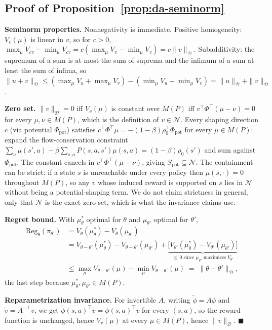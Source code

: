 \documentclass{article}
\newcommand{\Dnorm}[1]{\|#1\|_{\mathcal D}}
\begin{document}
\subsection{Proof of Proposition~\ref{prop:da-seminorm}}
\label{app:proof-da-seminorm}

\textbf{Seminorm properties.} Nonnegativity is immediate. Positive homogeneity:
$V_v(\mu)$ is linear in $v$, so for $c>0$, $\max_\mu V_{cv}-\min_\mu
V_{cv}=c(\max_\mu V_v-\min_\mu V_v)=c\Dnorm{v}$. Subadditivity: the supremum of
a sum is at most the sum of suprema and the infimum of a sum at least the sum
of infima, so
$\Dnorm{u+v}\le(\max_\mu V_u+\max_\mu V_v)-(\min_\mu V_u+\min_\mu
V_v)=\Dnorm{u}+\Dnorm{v}$.

\textbf{Zero set.} $\Dnorm{v}=0$ iff $V_v(\mu)$ is constant over $M(P)$ iff
$v^\top\Phi^\top(\mu-\nu)=0$ for every $\mu,\nu\in M(P)$, which is the
definition of $v\in\mathcal N$. Every shaping direction $c$ (via potential
$\Phi_{\mathrm{pot}}$) satisfies
$c^\top\Phi^\top\mu=-(1-\beta)\rho_0^\top\Phi_{\mathrm{pot}}$ for every
$\mu\in M(P)$: expand the flow-conservation constraint
$\sum_a\mu(s',a)-\beta\sum_{s,a}P(s,a,s')\mu(s,a)=(1-\beta)\rho_0(s')$ and sum
against $\Phi_{\mathrm{pot}}$. The constant cancels in
$c^\top\Phi^\top(\mu-\nu)$, giving $S_{\mathrm{pot}}\subseteq\mathcal N$. The
containment can be strict: if a state $s$ is unreachable under every policy then
$\mu(s,\cdot)=0$ throughout $M(P)$, so any $v$ whose induced reward is supported
on $s$ lies in $\mathcal N$ without being a potential-shaping term. We do not
claim strictness in general, only that $\mathcal N$ is the exact zero set, which
is what the invariance claims use.

\textbf{Regret bound.} With $\mu^*_\theta$ optimal for $\theta$ and
$\mu_{\theta'}$ optimal for $\theta'$,
\begin{align*}
\mathrm{Reg}_\theta(\pi_{\theta'})
&= V_\theta(\mu^*_\theta) - V_\theta(\mu_{\theta'}) \\
&= V_{\theta-\theta'}(\mu^*_\theta) - V_{\theta-\theta'}(\mu_{\theta'})
  + \underbrace{\big[V_{\theta'}(\mu^*_\theta)-V_{\theta'}(\mu_{\theta'})\big]}_{\le\,0
  \text{ since $\mu_{\theta'}$ maximizes }V_{\theta'}} \\
&\le \max_\mu V_{\theta-\theta'}(\mu) - \min_\mu V_{\theta-\theta'}(\mu)
\;=\; \Dnorm{\theta-\theta'},
\end{align*}
the last step because $\mu^*_\theta,\mu_{\theta'}\in M(P)$.

\textbf{Reparametrization invariance.} For invertible $A$, writing
$\tilde\phi=A\phi$ and $\tilde v=A^{-\top}v$, we get
$\tilde\phi(s,a)^\top\tilde v=\phi(s,a)^\top v$ for every $(s,a)$, so the reward
function is unchanged, hence $V_v(\mu)$ at every $\mu\in M(P)$, hence
$\Dnorm{v}$. $\blacksquare$
\end{document}

